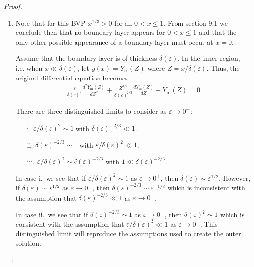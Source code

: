 \documentclass[12pt]{article}
\theoremstyle{definition}
\begin{document}
\begin{proof}
  \begin{enumerate}
    \item Note that for this BVP $x^{1/3} > 0$ for all $0 < x \leq 1$. From section 9.1 we conclude then
      that no boundary layer appears for $0 < x \leq 1$ and that the only other possible
      appearance of a boundary layer must occur at $x=0$.

      Assume that the boundary layer is of thickness $\delta(\varepsilon)$. In
      the inner region, i.e. when $x \ll \delta(\varepsilon)$, let
      $y(x) = Y_{\text{in}}(Z)$ where $Z = x / \delta(\varepsilon)$. Thus, the original
      differential equation becomes
      \begin{align*}
        \frac{\varepsilon}{\delta(\varepsilon)^2} \frac{d^2Y_{\text{in}}(Z)}{dZ^2} + \frac{Z^{1/3}}{\delta(\varepsilon)^{2/3}}\frac{dY_{\text{in}}(Z)}{dZ} - Y_{\text{in}}(Z) = 0
      \end{align*}

      There are three distinguished limits to consider as $\varepsilon \to 0^+$:
      \begin{itemize}
        \item[i.] $\varepsilon/\delta(\varepsilon)^2 \sim 1$ with $\delta(\varepsilon)^{-2/3} \ll 1$.
        \item[ii.] $\delta(\varepsilon)^{-2/3} \sim 1$ with $\varepsilon/\delta(\varepsilon)^2 \ll 1$.
        \item[iii.] $\varepsilon/\delta(\varepsilon)^2 \sim \delta(\varepsilon)^{-2/3}$ with $1 \ll \delta(\varepsilon)^{-2/3}$.
      \end{itemize}

      In case i.\ we see that if $\varepsilon/\delta(\varepsilon)^2 \sim 1$ as $\varepsilon \to 0^+$,
      then $\delta(\varepsilon) \sim \varepsilon^{1/2}$. However, if
      $\delta(\varepsilon) \sim \varepsilon^{1/2}$ as $\varepsilon \to 0^+$,
      then $\delta(\varepsilon)^{-2/3} \sim \varepsilon^{-1/3}$ which is inconsistent with the assumption
      that $\delta(\varepsilon)^{-2/3} \ll 1$ as $\varepsilon \to 0^+$.

      In case ii.\ we see that if $\delta(\varepsilon)^{-2/3} \sim 1$ as $\varepsilon \to 0^+$,
      then $\delta(\varepsilon)^2 \sim 1$ which is consistent with the assumption that $\varepsilon/\delta(\varepsilon)^2 \ll 1$
      as $\varepsilon \to 0^+$. This distinguished limit will reproduce the assumptions used to create the outer solution.


\end{enumerate}
\end{proof}
\end{document}

